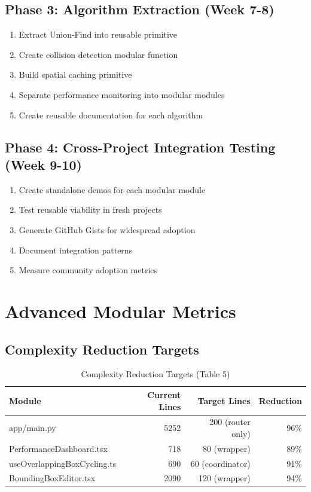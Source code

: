 \documentclass[11pt]{article}
\begin{document}
\subsection{Phase 3: Algorithm Extraction (Week 7-8)}

\begin{enumerate}
\item Extract Union-Find into reusable primitive
\item Create collision detection modular function
\item Build spatial caching primitive
\item Separate performance monitoring into modular modules
\item Create reusable documentation for each algorithm
\end{enumerate}

\subsection{Phase 4: Cross-Project Integration Testing (Week 9-10)}

\begin{enumerate}
\item Create standalone demos for each modular module
\item Test reusable viability in fresh projects
\item Generate GitHub Gists for widespread adoption
\item Document integration patterns
\item Measure community adoption metrics
\end{enumerate}

\section{Advanced Modular Metrics}

\subsection{Complexity Reduction Targets}

\begin{table}[h]
\centering
\begin{tabular}{|l|r|r|r|}
\hline
\textbf{Module} & \textbf{Current Lines} & \textbf{Target Lines} & \textbf{Reduction} \\
\hline
app/main.py & 5252 & 200 (router only) & 96\% \\
PerformanceDashboard.tsx & 718 & 80 (wrapper) & 89\% \\
useOverlappingBoxCycling.ts & 690 & 60 (coordinator) & 91\% \\
BoundingBoxEditor.tsx & 2090 & 120 (wrapper) & 94\% \\
\hline
\end{tabular}
\caption{Complexity Reduction Targets (Table 5)}
\end{table}
\label{table:complexity-targets}
\end{document}
